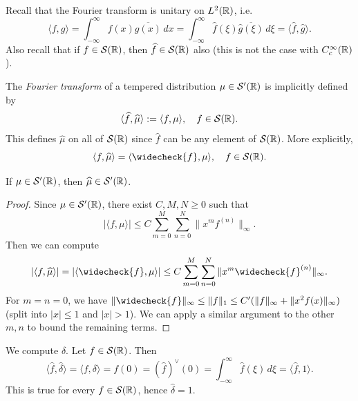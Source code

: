 \begin{remark}
  Recall that the Fourier transform
  is unitary on $L^2(\mathbb{R})$, i.e.
  \[
    \langle f, g \rangle
    = \int_{-\infty}^\infty f(x) \overline{g(x)}\, dx
    = \int_{-\infty}^\infty \widehat{f}(\xi) \overline{\widehat{g}(\xi)}\, d\xi
    = \langle \widehat{f}, \widehat{g} \rangle.
  \]
  Also recall that if
  $f \in \mathcal{S}(\mathbb{R})$, then
  $\widehat{f} \in \mathcal{S}(\mathbb{R})$ also
  (this is not the case
  with $C^\infty_c(\mathbb{R})$).
\end{remark}

\begin{definition}
  The \emph{Fourier transform} of a
  tempered distribution
  $\mu \in \mathcal{S}'(\mathbb{R})$ is
  implicitly defined by
  \[
    \langle \widehat{f}, \widehat{\mu} \rangle
    := \langle f, \mu \rangle,
    \quad f \in \mathcal{S}(\mathbb{R}).
  \]
  This defines $\widehat{\mu}$
  on all of $\mathcal{S}(\mathbb{R})$ since
  $\widehat{f}$ can be any element
  of $\mathcal{S}(\mathbb{R})$. More explicitly,
  \[
    \langle f, \widehat{\mu} \rangle
    = \langle \widecheck{f}, \mu \rangle,
    \quad f \in \mathcal{S}(\R).
  \]
\end{definition}

\begin{lemma}
  If $\mu \in \mathcal{S}'(\mathbb{R})$, then
  $\widehat{\mu} \in \mathcal{S}'(\mathbb{R})$.
\end{lemma}

\begin{proof}
  Since $\mu \in \mathcal{S}'(\mathbb{R})$, there
  exist $C, M, N \ge 0$ such that
  \[
    |\langle f, \mu \rangle|
    \le C \sum_{m = 0}^M \sum_{n = 0}^N
    \|x^m f^{(n)}\|_\infty.
  \]
  Then we can compute
  \[
    |\langle f, \widehat{\mu} \rangle|
    = |\langle \widecheck{f}, \mu \rangle|
    \le C \sum_{m = 0}^M \sum_{n = 0}^N
    \|x^m \widecheck{f}^{(n)}\|_\infty.
  \]
  For $m = n = 0$, we have
  $\|\widecheck{f}\|_\infty \le \|f\|_1 \le C'(\|f\|_\infty + \|x^2 f(x)\|_\infty)$
  (split into $|x| \le 1$ and $|x| > 1$).
  We can apply a similar argument to the
  other $m, n$ to bound the
  remaining terms.
\end{proof}

\begin{example}
  We compute $\widehat{\delta}$.
  Let $f \in \mathcal{S}(\mathbb{R})$. Then
  \[
    \langle \widehat{f}, \widehat{\delta} \rangle
    = \langle f, \delta \rangle
    = f(0)
    = (\widehat{f})^\vee(0)
    = \int_{-\infty}^\infty \widehat{f}(\xi)\, d\xi
    = \langle \widehat{f}, 1 \rangle.
  \]
  This is true for every $f \in \mathcal{S}(\mathbb{R})$,
  hence $\widehat{\delta} = 1$.
\end{example}

